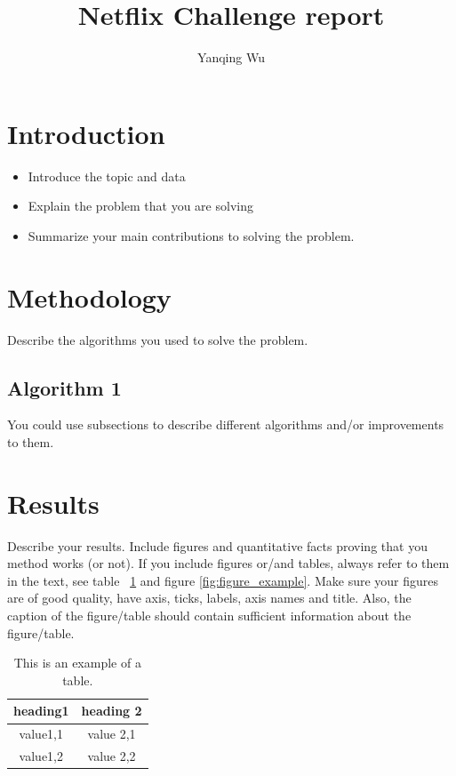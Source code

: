 \documentclass[english]{article}
\begin{document}
\title{Netflix Challenge report}

\author{Yanqing Wu}

\maketitle

\section{Introduction}
\label{sec:intro}
\begin{itemize}
\item Introduce the topic and data
\item Explain the problem that you are solving 
\item Summarize your main contributions to solving the problem.
\end{itemize}


\section{Methodology}
\label{sec:method}
Describe the algorithms you used to solve the problem.
\subsection{Algorithm 1}
You could use subsections to describe different algorithms and/or improvements to them.


\section{Results}
\label{sec:result}
Describe your results. 
Include figures and quantitative facts proving that you method works (or not).
If you include figures or/and tables, always refer to them in the text, see table ~\ref{tab:table_example} and figure \ref{fig:figure_example}.
Make sure your figures are of good quality, have axis, ticks, labels, axis names and title. Also, the caption of the figure/table should contain sufficient information about the figure/table.
\begin{table}
\centering
\begin{tabular}{cc} 
\hline
heading1 &  heading 2  \\
\hline
value1,1 & value 2,1\\
value1,2 & value 2,2\\
\hline
\end{tabular}
\caption{This is an example of a table.} 
\label{tab:table_example}
\end{table}
\end{document}
